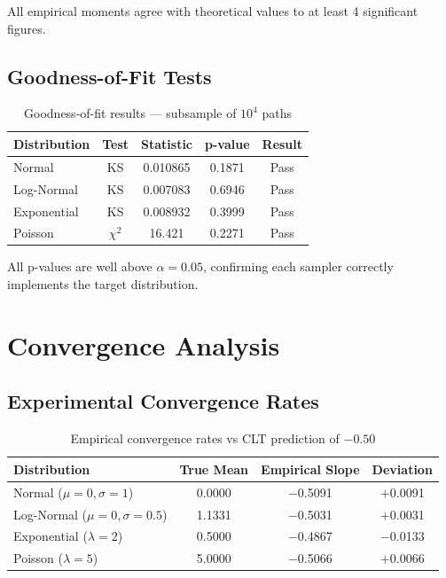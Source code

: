 \documentclass[12pt,a4paper]{article}
\begin{document}
All empirical moments agree with theoretical values to at least 4 significant figures.

\subsection{Goodness-of-Fit Tests}

\begin{table}[H]
\centering
\caption{Goodness-of-fit results --- subsample of $10^4$ paths}
\renewcommand{\arraystretch}{1.3}
\begin{tabular}{lcccc}
\toprule
\textbf{Distribution} & \textbf{Test} & \textbf{Statistic} & \textbf{p-value} & \textbf{Result}\\
\midrule
Normal      & KS       & 0.010865 & 0.1871 & Pass\\
Log-Normal  & KS       & 0.007083 & 0.6946 & Pass\\
Exponential & KS       & 0.008932 & 0.3999 & Pass\\
Poisson     & $\chi^2$ & 16.421   & 0.2271 & Pass\\
\bottomrule
\end{tabular}
\end{table}

All p-values are well above $\alpha=0.05$, confirming each sampler correctly implements
the target distribution.

\section{Convergence Analysis}
\label{sec:convergence}

\subsection{Experimental Convergence Rates}

\begin{table}[H]
\centering
\caption{Empirical convergence rates vs CLT prediction of $-0.50$}
\renewcommand{\arraystretch}{1.3}
\begin{tabular}{lccc}
\toprule
\textbf{Distribution} & \textbf{True Mean} & \textbf{Empirical Slope} & \textbf{Deviation}\\
\midrule
Normal ($\mu{=}0,\sigma{=}1$)       & 0.0000 & $-$0.5091 & $+$0.0091\\
Log-Normal ($\mu{=}0,\sigma{=}0.5$) & 1.1331 & $-$0.5031 & $+$0.0031\\
Exponential ($\lambda{=}2$)         & 0.5000 & $-$0.4867 & $-$0.0133\\
Poisson ($\lambda{=}5$)             & 5.0000 & $-$0.5066 & $+$0.0066\\
\bottomrule
\end{tabular}
\end{table}
\end{document}
